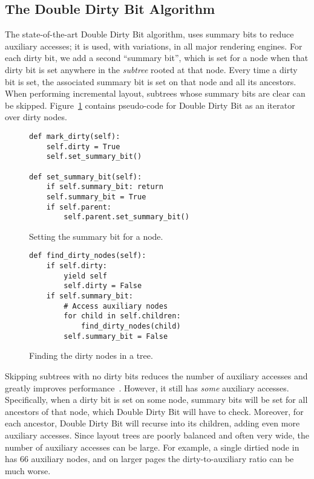 \subsection{The Double Dirty Bit Algorithm}

The state-of-the-art Double Dirty Bit algorithm,
  uses summary bits to reduce auxiliary accesses;
  it is used, with variations, in all major rendering engines.
For each dirty bit, we add a second ``summary bit'',
  which is set for a node when that dirty bit is set
  anywhere in the \emph{subtree} rooted at that node.
Every time a dirty bit is set,
  the associated summary bit is set
  on that node and all its ancestors.
When performing incremental layout,
  subtrees whose summary bits are clear can be skipped.
Figure~\ref{fig:find-dirty-nodes} contains
  pseudo-code for Double Dirty Bit
  as an iterator over dirty nodes.

\begin{figure}
\begin{minipage}[b]{0.5\linewidth}
\begin{verbatim}
def mark_dirty(self):
    self.dirty = True
    self.set_summary_bit()

def set_summary_bit(self):
    if self.summary_bit: return
    self.summary_bit = True
    if self.parent:
        self.parent.set_summary_bit()
\end{verbatim}
\caption{Setting the summary bit for a node.}
\label{fig:set-summary-bits}
\end{minipage}\hfill%
\begin{minipage}[b]{0.5\linewidth}
\begin{verbatim}
def find_dirty_nodes(self):
    if self.dirty:
        yield self
        self.dirty = False
    if self.summary_bit:
        # Access auxiliary nodes
        for child in self.children:
            find_dirty_nodes(child)
        self.summary_bit = False
\end{verbatim}
\caption{Finding the dirty nodes in a tree.}
\label{fig:find-dirty-nodes}
\end{minipage}
\end{figure}

Skipping subtrees with no dirty bits
  reduces the number of auxiliary accesses
  and greatly improves performance~\cite{tali-garseil,wbe}.
However, it still has \emph{some} auxiliary accesses.
Specifically, when a dirty bit is set on some node,
  summary bits will be set for all ancestors of that node,
  which Double Dirty Bit will have to check.
Moreover, for each ancestor,
  Double Dirty Bit will recurse into its children,
  adding even more auxiliary accesses.
Since layout trees are poorly balanced and often very wide,
  the number of auxiliary accesses can be large.
For example,
  a single dirtied node in  has 66 auxiliary nodes,
  and on larger pages the dirty-to-auxiliary ratio can be much worse.

